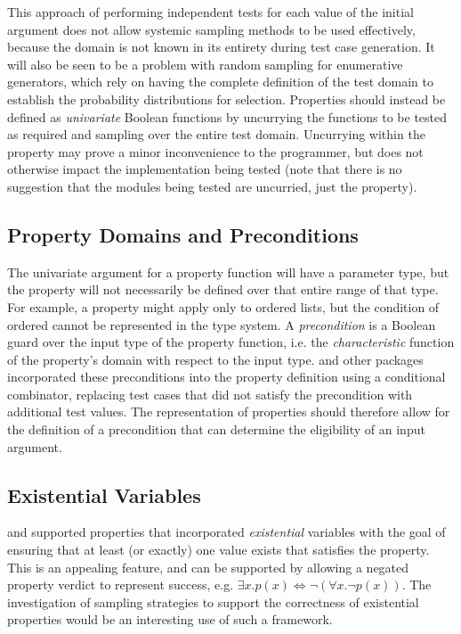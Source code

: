 This approach of performing independent tests for each value of the initial argument
does not allow systemic sampling methods to be used effectively,
because the domain is not known in its entirety during test case generation.
It will also be seen to be a problem with random sampling for enumerative generators,
which rely on having the complete definition of the test domain to
establish the probability distributions for selection.
Properties should instead be defined as \emph{univariate} Boolean functions
by uncurrying the functions to be tested as required and
sampling over the entire test domain.
Uncurrying within the property
may prove a minor inconvenience to the programmer,
but does not otherwise impact the implementation being tested
(note that there is no suggestion that the modules being tested are uncurried, just the property).

\subsection{Property Domains and Preconditions}
The univariate argument for a property function will have a parameter type,
but the property will not necessarily be defined over that entire range of that type.
For example, a property might apply only to ordered lists,
but the condition of ordered cannot be represented in the type system.
A \emph{precondition} is a Boolean guard over the input type of the property function,
i.e. the \emph{characteristic} function of the property's domain with respect to the input type.
\QC and other packages incorporated these preconditions into the property definition
using a conditional combinator,
replacing test cases that did not satisfy the precondition with additional test values.
The representation of properties should therefore allow for the definition of a precondition
that can determine the eligibility of an input argument.

\subsection{Existential Variables}

\SC and \GAST supported properties that incorporated \emph{existential} variables
with the goal of ensuring that at least (or exactly) one value exists that satisfies the property.
This is an appealing feature,
and can be supported  by allowing a negated property verdict to represent success,
e.g. $\exists x . p (x) \iff \neg (\forall x . \neg p (x))$.
The investigation of sampling strategies to support the correctness of existential properties
would be an interesting use of such a framework.

